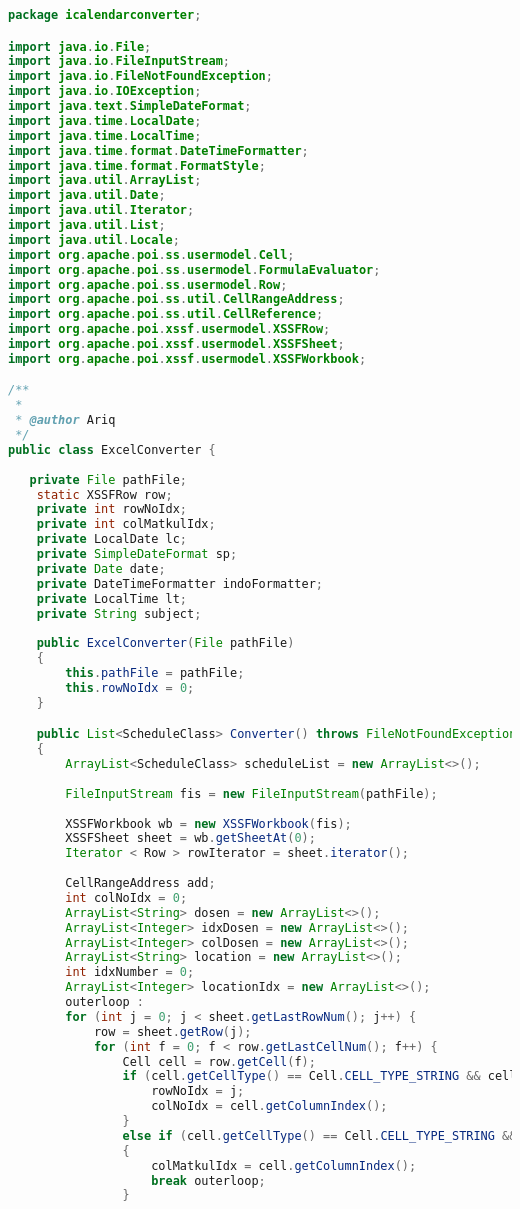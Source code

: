 \begin{lstlisting}[language=Java,basicstyle=\tiny,caption=ExcelConverter.java,label=lst:ExcelConverter]
package icalendarconverter;

import java.io.File;
import java.io.FileInputStream;
import java.io.FileNotFoundException;
import java.io.IOException;
import java.text.SimpleDateFormat;
import java.time.LocalDate;
import java.time.LocalTime;
import java.time.format.DateTimeFormatter;
import java.time.format.FormatStyle;
import java.util.ArrayList;
import java.util.Date;
import java.util.Iterator;
import java.util.List;
import java.util.Locale;
import org.apache.poi.ss.usermodel.Cell;
import org.apache.poi.ss.usermodel.FormulaEvaluator;
import org.apache.poi.ss.usermodel.Row;
import org.apache.poi.ss.util.CellRangeAddress;
import org.apache.poi.ss.util.CellReference;
import org.apache.poi.xssf.usermodel.XSSFRow;
import org.apache.poi.xssf.usermodel.XSSFSheet;
import org.apache.poi.xssf.usermodel.XSSFWorkbook;

/**
 *
 * @author Ariq
 */
public class ExcelConverter {
    
   private File pathFile;
    static XSSFRow row;
    private int rowNoIdx;
    private int colMatkulIdx;
    private LocalDate lc;
    private SimpleDateFormat sp;
    private Date date;
    private DateTimeFormatter indoFormatter;
    private LocalTime lt;
    private String subject;
    
    public ExcelConverter(File pathFile)
    {
        this.pathFile = pathFile;
        this.rowNoIdx = 0;
    }

    public List<ScheduleClass> Converter() throws FileNotFoundException, IOException
    {
        ArrayList<ScheduleClass> scheduleList = new ArrayList<>();
        
        FileInputStream fis = new FileInputStream(pathFile);
        
        XSSFWorkbook wb = new XSSFWorkbook(fis);
        XSSFSheet sheet = wb.getSheetAt(0);
        Iterator < Row > rowIterator = sheet.iterator();   
     
        CellRangeAddress add;
        int colNoIdx = 0;
        ArrayList<String> dosen = new ArrayList<>();
        ArrayList<Integer> idxDosen = new ArrayList<>();
        ArrayList<Integer> colDosen = new ArrayList<>();
        ArrayList<String> location = new ArrayList<>();
        int idxNumber = 0;
        ArrayList<Integer> locationIdx = new ArrayList<>();
        outerloop :
        for (int j = 0; j < sheet.getLastRowNum(); j++) {
            row = sheet.getRow(j);
            for (int f = 0; f < row.getLastCellNum(); f++) {
                Cell cell = row.getCell(f);
                if (cell.getCellType() == Cell.CELL_TYPE_STRING && cell.getStringCellValue().equalsIgnoreCase("No.")) {
                    rowNoIdx = j;
                    colNoIdx = cell.getColumnIndex();
                }
                else if (cell.getCellType() == Cell.CELL_TYPE_STRING && cell.getStringCellValue().equalsIgnoreCase("Nama Mata Kuliah"))
                {
                    colMatkulIdx = cell.getColumnIndex();
                    break outerloop;
                }
                     

\end{lstlisting}
